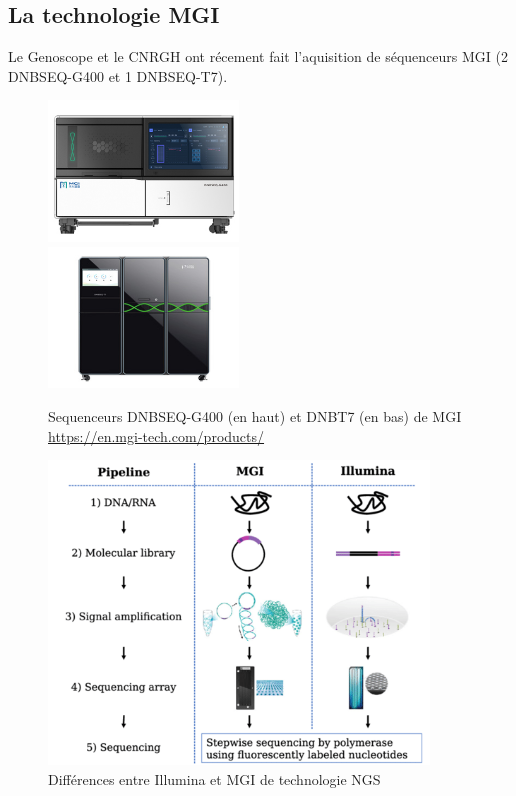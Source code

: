 \subsection{La technologie MGI}
Le Genoscope et le CNRGH ont récement fait l'aquisition de séquenceurs MGI (2 DNBSEQ-G400 et 1 DNBSEQ-T7).

\begin{minipage}{0.45\textwidth}
    \begin{figure}[H]
        \centering
        \includegraphics[width=0.45\textwidth]{img/MGI_G400.jpg}\\
        \includegraphics[width=0.45\textwidth]{img/MGI_T7.jpg}
        \caption{\footnotesize{Sequenceurs DNBSEQ-G400 (en haut) et DNBT7 (en bas) de MGI \href{https://en.mgi-tech.com/products/}{https://en.mgi-tech.com/products/}}}
        \label{seq-MGI}
    \end{figure}
\end{minipage} 
\hfill
\begin{minipage}{0.45\textwidth}
	\begin{figure}[H]
        \centering
        \includegraphics[width=0.9\textwidth]{img/MGI_vs_Illumina.png}
        \caption{\footnotesize{Différences entre Illumina et MGI de technologie NGS}}
        \label{fig-Illu-vs-MGI}
    \end{figure}
\end{minipage}\\\\

